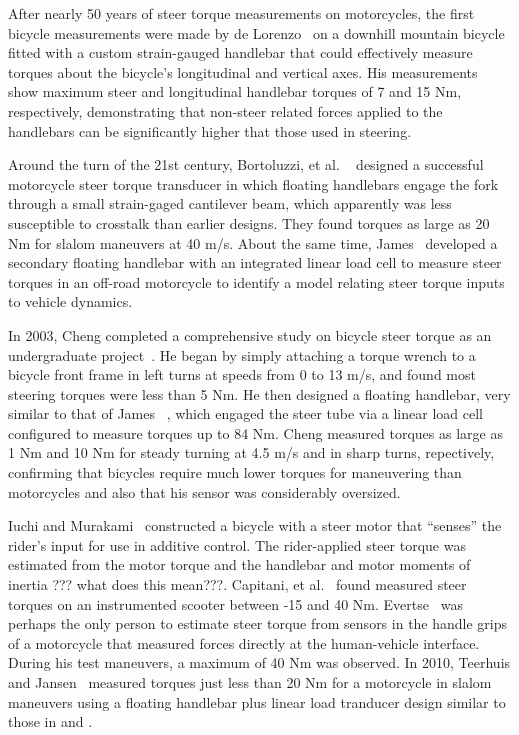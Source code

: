 \documentclass[10pt]{article}
\begin{document}
After nearly 50 years of steer torque measurements on motorcycles, the first
bicycle measurements were made by de Lorenzo~\cite{Lorenzo1997} on a downhill
mountain bicycle fitted with a custom strain-gauged handlebar that
could effectively measure torques about the bicycle's longitudinal and vertical
axes. His measurements show maximum steer and longitudinal handlebar torques of 7 and
15 Nm, respectively, demonstrating that
non-steer related forces applied to the handlebars can be significantly higher
that those used in steering.

Around the turn of the 21st century, Bortoluzzi, et al. ~\cite{Bortoluzzi2000} designed
a successful motorcycle steer torque transducer in which floating handlebars
engage the fork through a small strain-gaged cantilever beam, which apparently was
less susceptible to crosstalk than earlier designs. They found torques as large as 20
Nm for slalom maneuvers at 40 m/s. About the same time, James~\cite{James2002}
developed a secondary floating handlebar with an integrated linear load cell to
measure steer torques in an off-road motorcycle to identify
a model relating steer torque inputs to vehicle dynamics.

In 2003, Cheng completed a comprehensive study on bicycle
steer torque as an undergraduate project~\cite{Cheng2003}. He began by simply attaching a
torque wrench to a bicycle front frame in left turns at speeds from 0
to 13 m/s, and found most steering torques were less than 5 Nm. He then
designed a floating handlebar, very similar to that of James~\cite{James2002} , 
which engaged the steer tube via a linear load
cell configured to measure torques up to 84 Nm.
Cheng measured torques as large as 1 Nm and 10 Nm for steady turning at 4.5 m/s 
and in sharp turns, repectively, confirming that bicycles require much lower torques for
maneuvering than motorcycles and also that his sensor was considerably oversized.

Iuchi and Murakami~\cite{Iuchi2006} constructed a bicycle with a steer motor that ``senses''
the rider's input for use in additive control. The rider-applied steer torque
was estimated from the motor torque and the handlebar and motor moments of
inertia ??? what does this mean???. Capitani, et al.~\cite{Capitani2006} found measured steer torques on an
instrumented scooter between -15 and 40 Nm. Evertse~\cite{Evertse2010} was
perhaps the only person to estimate steer torque from sensors in the handle
grips of a motorcycle that measured forces directly at the
human-vehicle interface. During his test maneuvers, a maximum of 40 Nm was
observed. In 2010, Teerhuis and Jansen~\cite{Teerhuis2010}  measured torques just
less than 20 Nm for a motorcycle in slalom maneuvers using a floating handlebar
plus linear load tranducer design similar to those in \cite{James2002} and
\cite{Cheng2003}.
\end{document}
